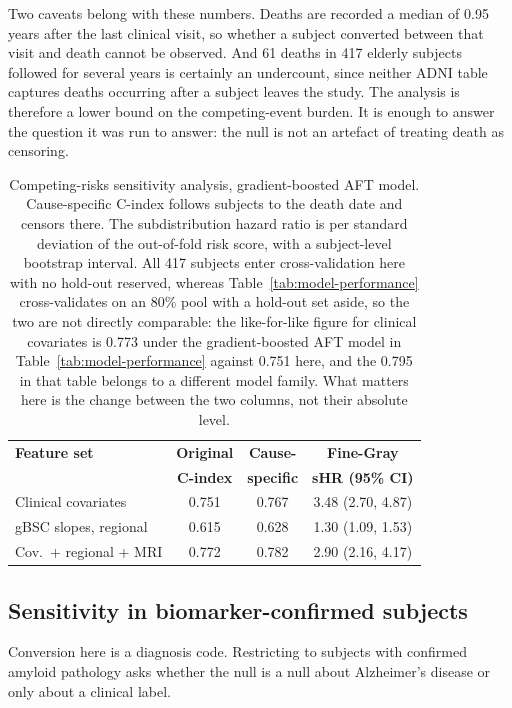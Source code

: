\documentclass[blue]{ludusofficial}  %
\begin{document}
Two caveats belong with these numbers. Deaths are recorded a median of 0.95 years after the last clinical visit, so whether a subject converted between that visit and death cannot be observed. And 61 deaths in 417 elderly subjects followed for several years is certainly an undercount, since neither ADNI table captures deaths occurring after a subject leaves the study. The analysis is therefore a lower bound on the competing-event burden. It is enough to answer the question it was run to answer: the null is not an artefact of treating death as censoring.

\begin{table}[htbp]
\centering
\footnotesize
\setlength{\tabcolsep}{4pt}
\caption{Competing-risks sensitivity analysis, gradient-boosted AFT model. Cause-specific C-index follows subjects to the death date and censors there. The subdistribution hazard ratio is per standard deviation of the out-of-fold risk score, with a subject-level bootstrap interval. All 417 subjects enter cross-validation here with no hold-out reserved, whereas Table~\ref{tab:model-performance} cross-validates on an 80\% pool with a hold-out set aside, so the two are not directly comparable: the like-for-like figure for clinical covariates is 0.773 under the gradient-boosted AFT model in Table~\ref{tab:model-performance} against 0.751 here, and the 0.795 in that table belongs to a different model family. What matters here is the change between the two columns, not their absolute level.}
\label{tab:competing}
\begin{tabular}{lccc}
\hline
\textbf{Feature set} & \textbf{Original} & \textbf{Cause-} & \textbf{Fine-Gray} \\
 & \textbf{C-index} & \textbf{specific} & \textbf{sHR (95\% CI)} \\
\hline
Clinical covariates & 0.751 & 0.767 & 3.48 (2.70, 4.87) \\
gBSC slopes, regional & 0.615 & 0.628 & 1.30 (1.09, 1.53) \\
Cov.\ + regional + MRI & 0.772 & 0.782 & 2.90 (2.16, 4.17) \\
\hline
\end{tabular}
\end{table}

\subsection{Sensitivity in biomarker-confirmed subjects}

Conversion here is a diagnosis code. Restricting to subjects with confirmed amyloid pathology asks whether the null is a null about Alzheimer's disease or only about a clinical label.
\end{document}
